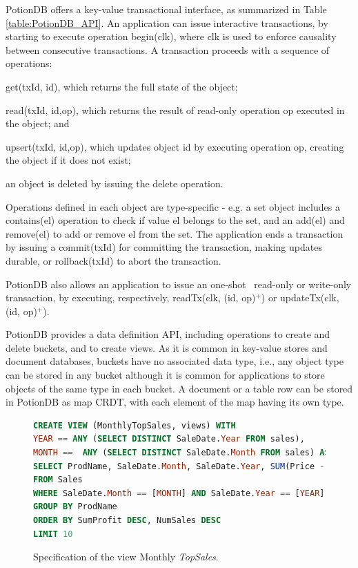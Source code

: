 \documentclass[sigplan,review,anonymous]{acmart}
\newcommand{\code}[1]{\textsf{\small{#1}}}
\begin{document}
PotionDB offers a key-value  transactional interface, as summarized in Table \ref{table:PotionDB_API}.
An application can issue interactive transactions, by starting to execute operation \code{begin(clk)},
where \code{clk} is used to enforce causality between consecutive transactions.
A transaction proceeds with a sequence of operations: 
\begin{inparaenum}[(i)] 
\item \code{get(txId, id)}, which returns the full state of the object;
\item \code{read(txId, id,op)}, which returns the result of read-only operation \code{op} executed in the object; and
\item \code{upsert(txId, id,op)}, which updates object \code{id} by executing operation \code{op}, creating the object if it does not exist; 
\item an object is deleted by issuing the \code{delete}  operation.
\end{inparaenum}
Operations defined in each object are type-specific - e.g. a set object includes a \code{contains(el)} operation to check
if value \code{el} belongs to the set, and an \code{add(el)} and \code{remove(el)} to add or remove \code{el} from the set.
The application ends a transaction by issuing a \code{commit(txId)} for committing the transaction, making updates durable,  or \code{rollback(txId)} to abort the transaction.

PotionDB also allows an application to issue an one-shot~\cite{??????} read-only or write-only transaction,
by executing, respectively, \code{readTx(clk, (id, op)$^+$)} or \code{updateTx(clk, (id, op)$^+$)}.

PotionDB provides a data definition API, including operations to create and delete buckets, and 
to create views. As it is common in key-value stores and document databases, buckets have no associated
data type, i.e., any object type can be stored in any bucket although it is common for applications to 
store objects of the same type in each bucket.  A document or a table row can be stored in 
PotionDB as map CRDT, with each element of the map having its own type. 


\begin{figure}[t]
\small{
\begin{lstlisting}[language=SQL]
CREATE VIEW (MonthlyTopSales, views) WITH 
YEAR == ANY (SELECT DISTINCT SaleDate.Year FROM sales), 
MONTH ==  ANY (SELECT DISTINCT SaleDate.Month FROM sales) AS
SELECT ProdName, SaleDate.Month, SaleDate.Year, SUM(Price - Cost) AS SumProfit, COUNT(*) AS NumSales
FROM Sales
WHERE SaleDate.Month == [MONTH] AND SaleDate.Year == [YEAR]
GROUP BY ProdName
ORDER BY SumProfit DESC, NumSales DESC
LIMIT 10
\end{lstlisting}}
	\caption{Specification of the view Monthly \emph{TopSales}.}
	\label{fig:viewtopsales}
\end{figure}
\end{document}
